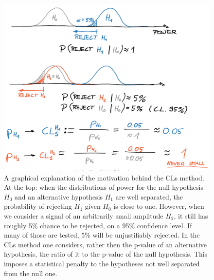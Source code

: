 
\begin{figure}
  \centering \includegraphics[width=0.7\linewidth]{gfx/axions/CLs.png}
  \caption{A graphical explanation of the motivation behind the CLs method. At the top: when the distributions of power for the null hypothesis $H_0$ and an alternative hypothesis $H_1$ are well separated, the probability of rejecting $H_1$ given $H_0$ is close to one. However, when we consider a signal of an arbitrarily small amplitude $H_2$, it still has roughly 5\% chance to be rejected, on a 95\% confidence level. If many of those are tested, 5\% will be unjustifiably rejected. In the CLs method one considers, rather then the p-value of an alternative hypothesis, the ratio of it to the p-value of the null hypothesis. This imposes a statistical penalty to the hypotheses not well separated from the null one.}\label{fig:CLs}
\end{figure}

